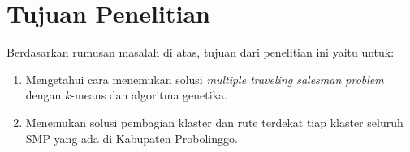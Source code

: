 \section{Tujuan Penelitian}

Berdasarkan rumusan masalah di atas, tujuan dari penelitian ini yaitu untuk:
\begin{enumerate}
	\item Mengetahui cara menemukan solusi \textit{multiple traveling salesman problem} dengan $k$-means dan algoritma genetika.
	\item Menemukan solusi pembagian klaster dan rute terdekat tiap klaster seluruh SMP yang ada di Kabupaten Probolinggo.
\end{enumerate}
